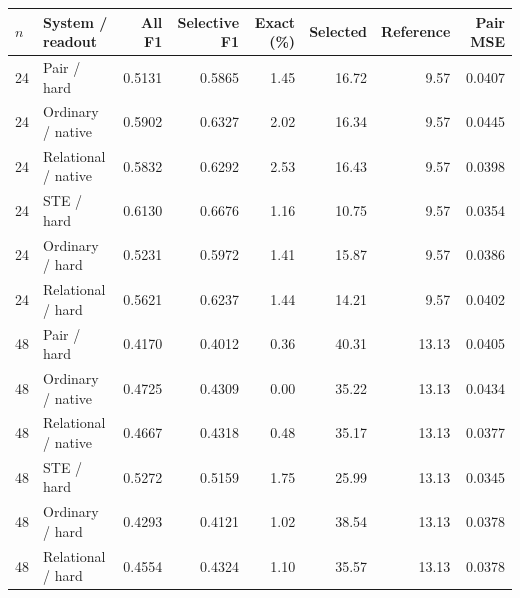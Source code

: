 \begin{tabular*}{\linewidth}{@{\extracolsep{\fill}}llrrrrrr@{}}\toprule
$n$ & System / readout & All F1 & Selective F1 & Exact (\%) & Selected & Reference & Pair MSE\\\midrule
24 & Pair / hard & 0.5131 & 0.5865 & 1.45 & 16.72 & 9.57 & 0.0407\\
24 & Ordinary / native & 0.5902 & 0.6327 & 2.02 & 16.34 & 9.57 & 0.0445\\
24 & Relational / native & 0.5832 & 0.6292 & 2.53 & 16.43 & 9.57 & 0.0398\\
24 & STE / hard & 0.6130 & 0.6676 & 1.16 & 10.75 & 9.57 & 0.0354\\
24 & Ordinary / hard & 0.5231 & 0.5972 & 1.41 & 15.87 & 9.57 & 0.0386\\
24 & Relational / hard & 0.5621 & 0.6237 & 1.44 & 14.21 & 9.57 & 0.0402\\
\midrule
48 & Pair / hard & 0.4170 & 0.4012 & 0.36 & 40.31 & 13.13 & 0.0405\\
48 & Ordinary / native & 0.4725 & 0.4309 & 0.00 & 35.22 & 13.13 & 0.0434\\
48 & Relational / native & 0.4667 & 0.4318 & 0.48 & 35.17 & 13.13 & 0.0377\\
48 & STE / hard & 0.5272 & 0.5159 & 1.75 & 25.99 & 13.13 & 0.0345\\
48 & Ordinary / hard & 0.4293 & 0.4121 & 1.02 & 38.54 & 13.13 & 0.0378\\
48 & Relational / hard & 0.4554 & 0.4324 & 1.10 & 35.57 & 13.13 & 0.0378\\
\bottomrule\end{tabular*}
